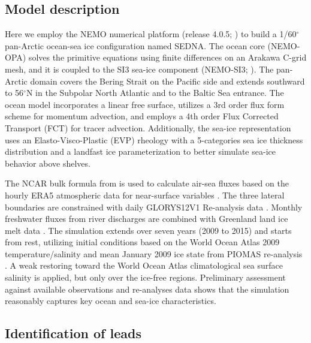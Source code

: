 \documentclass[lineno,sn-basic]{sn-jnl}%
\begin{document}
\subsection*{Model description}

Here we employ the NEMO numerical platform (release 4.0.5; \citealp{NEMO_man}) to build a 1/60$^\circ$ pan-Arctic ocean-sea ice configuration named SEDNA. The ocean core (NEMO-OPA) solves the primitive equations using finite differences on an Arakawa C-grid mesh, and it is coupled to the SI3 sea-ice component (NEMO-SI3; \citealp{SI3_man}). The pan-Arctic domain covers the Bering Strait on the Pacific side and extends southward to 56$^\circ$N in the Subpolar North Atlantic and to the Baltic Sea entrance. The ocean model incorporates a linear free surface, utilizes a 3rd order flux form scheme for momentum advection, and employs a 4th order Flux Corrected Transport (FCT) for tracer advection. Additionally, the sea-ice representation uses an Elasto-Visco-Plastic (EVP) rheology with a 5-categories sea ice thickness distribution and a landfast ice parameterization to better simulate sea-ice behavior above shelves.

The NCAR bulk formula from \citet{Large_global_2009} is used to calculate air-sea fluxes based on the hourly ERA5 atmospheric data for near-surface variables \citep{Hersbach_ERA5_2020}. The three lateral boundaries are constrained with daily GLORYS12V1 Re-analysis data \citep{GLORYS12}. Monthly freshwater fluxes from river discharges are combined with Greenland land ice melt data \citep{HuEA_rivers_2019}. The simulation extends over seven years (2009 to 2015) and starts from rest, utilizing initial conditions based on the World Ocean Atlas 2009 temperature/salinity and mean January 2009 ice state from PIOMAS re-analysis \citep{Locarnini_data_2010, PIOMAS}. A weak restoring toward the World Ocean Atlas climatological sea surface salinity is applied, but only over the ice-free regions. Preliminary assessment against available observations and re-analyses data shows that the simulation reasonably captures key ocean and sea-ice characteristics.

\subsection*{Identification of leads}
\end{document}
